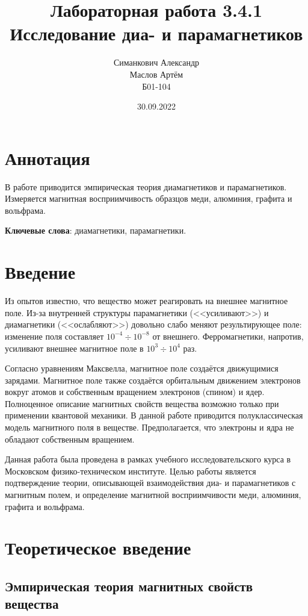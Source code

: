 \documentclass[12pt,a4paper]{article}
\title{Лабораторная работа 3.4.1\\ Исследование диа- и парамагнетиков}
\author{Симанкович Александр \\ Маслов Артём \\ Б01-104}
\date{30.09.2022}
\begin{document}
	\maketitle
	
	\section*{Аннотация}
	
	В работе приводится эмпирическая теория диамагнетиков и парамагнетиков. Измеряется магнитная восприимчивость образцов меди, алюминия, графита и вольфрама.
		
	\vspace{10pt}
	\noindent\textbf{Ключевые слова}: диамагнетики, парамагнетики.
	
	\section*{Введение}
	
	Из опытов известно, что вещество может реагировать на внешнее магнитное поле. Из-за внутренней структуры парамагнетики (<<усиливают>>) и диамагнетики (<<ослабляют>>) довольно слабо меняют результирующее поле: изменение поля составляет $10^{-4} \div 10^{-8}$ от внешнего. Ферромагнетики, напротив, усиливают внешнее магнитное поле в $10^3 \div 10^4$ раз.
	
	Согласно уравнениям Максвелла, магнитное поле создаётся движущимися зарядами. Магнитное поле также создаётся орбитальным движением электронов вокруг атомов и собственным вращением электронов (спином) и ядер. Полноценное описание магнитных свойств вещества возможно только при применении квантовой механики. В данной работе приводится полуклассическая модель магнитного поля в веществе. Предполагается, что электроны и ядра не обладают собственным вращением.
			
	Данная работа была проведена в рамках учебного исследовательского курса в Московском физико-техническом институте. Целью работы является подтверждение теории, описывающей взаимодействия диа- и парамагнетиков с магнитным полем, и определение магнитной восприимчивости меди, алюминия, графита и вольфрама.
	
	\section*{Теоретическое введение}
	\subsection*{Эмпирическая теория магнитных свойств вещества}
	
\end{document}
